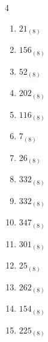 \begin{multicols}{4}
\begin{enumerate}
        \phantom{$=112$}

  \item $21_{(8)}$

        \phantom{$=17$}

  \item $156_{(8)}$

        \phantom{$=110$}

  \item $52_{(8)}$

        \phantom{$=42$}

  \item $202_{(8)}$

        \phantom{$=130$}

\columnbreak %

  \item $116_{(8)}$

        \phantom{$=78$}

  \item $7_{(8)}$

        \phantom{$=7$}

  \item $26_{(8)}$

        \phantom{$=22$}

  \item $332_{(8)}$

        \phantom{$=218$}

  \item $332_{(8)}$

        \phantom{$=218$}

  \item $347_{(8)}$

        \phantom{$=231$}

  \item $301_{(8)}$

        \phantom{$=193$}

  \item $25_{(8)}$

        \phantom{$=21$}

  \item $262_{(8)}$

        \phantom{$=178$}

  \item $154_{(8)}$

        \phantom{$=108$}

  \item $225_{(8)}$

        \phantom{$=149$}


\end{enumerate}
\end{multicols}
